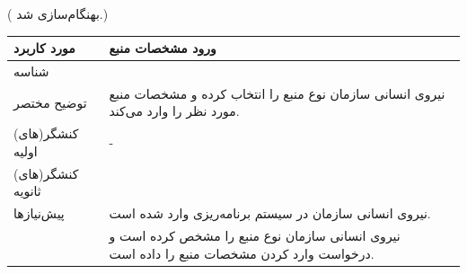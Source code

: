 \newpage
\begin{table}[H]
	({\color{red} بهنگام‌سازی شد.})
	\centering
	\begin{tabular}{|p{3cm}|p{11cm}|}
		\hline
		
		مورد کاربرد & ورود مشخصات منبع  \\
		\hline
		
		شناسه & 
		\stepcounter{usecase_ID}
		
		\arabic{usecase_ID} \\
		
		\hline
		
		توضیح مختصر & نیروی انسانی سازمان نوع منبع را انتخاب کرده و مشخصات منبع مورد نظر را وارد می‌کند. \\
		\hline
		
		کنشگر(های) اولیه& - \\
		\hline
		
		کنشگر(های) ثانویه&  \\
		\hline
		
		پیش‌نیازها &
		نیروی انسانی سازمان در سیستم برنامه‌ریزی وارد شده است.\\
		& نیروی انسانی سازمان نوع منبع را مشخص کرده است و درخواست وارد کردن مشخصات منبع را داده است. \\
		\hline
		

\end{tabular}
\end{table}
